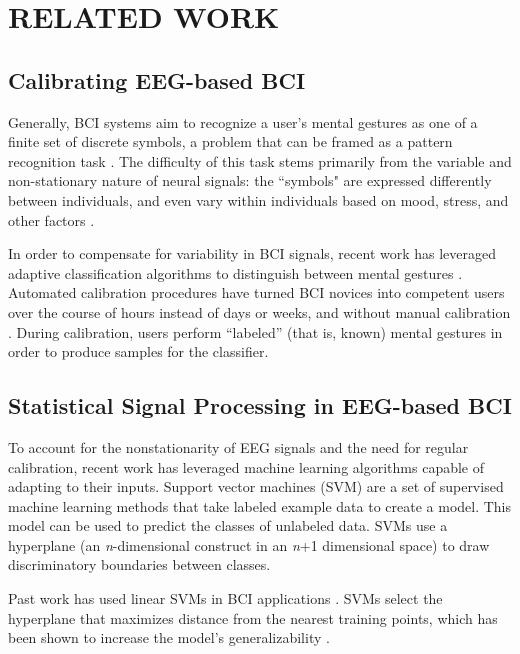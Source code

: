 \section{\uppercase{Related Work}}
\label{sec:related}

\subsection{Calibrating EEG-based BCI}

\noindent Generally, BCI systems aim to recognize a user's mental gestures as one of a finite set of discrete symbols, a problem that can be framed as a pattern recognition task \cite{lotte_review_2007}. The difficulty of this task stems primarily from the variable and non-stationary nature of neural signals: the ``symbols" are expressed differently between individuals, and even vary within individuals based on mood, stress, and other factors \cite{vidaurre_machine-learning-based_2011}. 

In order to compensate for variability in BCI signals, recent work has leveraged adaptive classification algorithms to distinguish between mental gestures \cite{lotte_review_2007,vidaurre_machine-learning-based_2011,friedrich2013whatever}. Automated calibration procedures have turned BCI novices into competent users over the course of hours instead of days or weeks, and without manual calibration \cite{vidaurre_machine-learning-based_2011}. During calibration, users perform ``labeled'' (that is, known) mental gestures in order to produce samples for the classifier.

\subsection{Statistical Signal Processing in EEG-based BCI}

To account for the nonstationarity of EEG signals and the need for regular calibration, recent work has leveraged machine learning algorithms capable of adapting to their inputs. Support vector machines (SVM) are a set of supervised machine learning methods that take labeled example data to create a model. This model can be used to predict the classes of unlabeled data. SVMs use a hyperplane (an \emph{n}-dimensional construct in an \emph{n}+1 dimensional space) to draw discriminatory boundaries between classes. 

Past work has used linear SVMs in BCI applications \cite{garrett_comparison_2003,grierson_better_2011}. SVMs select the hyperplane that maximizes distance from the nearest training points, which has been shown to increase the model's generalizability \cite{burges_tutorial_1998}. 

